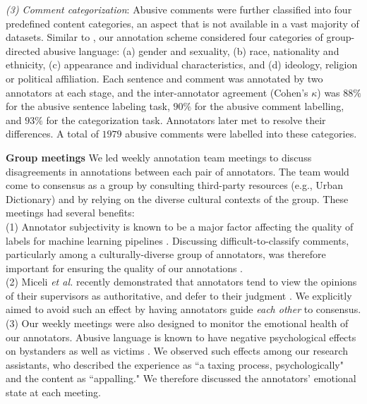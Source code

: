 \documentclass[letterpaper]{article} %
\begin{document}
 \textit{(3) Comment categorization}: Abusive comments were further classified into four predefined  content categories, an aspect that is not available in a vast majority of  datasets.  Similar to \cite{founta2018large}, our annotation scheme considered four categories of group-directed abusive language: (a) gender and sexuality, (b) race, nationality and ethnicity, (c) appearance and individual characteristics, and (d) ideology, religion or political affiliation.
 Each sentence and comment was annotated by two annotators at each stage, and the inter-annotator agreement (Cohen's $\kappa$) was $88\%$ for the abusive sentence labeling task, $90\%$ for the abusive comment labelling, and $93\%$ for the categorization task. Annotators later met to resolve their differences. A total of $1979$ abusive comments were labelled into these categories.


\noindent\textbf{Group meetings}
We led weekly annotation team meetings to discuss disagreements in annotations between each pair of annotators.
The team would come to consensus as a group by consulting third-party resources (e.g., Urban Dictionary) and by relying on the diverse cultural contexts of the group.
These meetings had several benefits: \\
(1) Annotator subjectivity is known to be a major factor affecting the quality of labels for machine learning pipelines \cite{hube2019understanding}.
Discussing difficult-to-classify comments, particularly among a culturally-diverse group of annotators, was therefore important for ensuring the quality of our annotations \cite{vidgen2019challenges}. \\
\noindent (2) Miceli \textit{et al.} recently demonstrated that annotators tend to view the opinions of their supervisors as authoritative, and defer to their judgment  \cite{miceli2020between}.
We explicitly aimed to avoid such an effect by having annotators guide \textit{each other} to consensus. \\
(3) Our weekly meetings were also designed to monitor the emotional health of our annotators.
Abusive language is known  to have negative psychological effects on bystanders as well as victims \cite{low2007experiences,ferguson2011know}.
We observed such effects among our research assistants, who described the experience as ``a taxing process, psychologically" and the content as ``appalling."
We therefore discussed the annotators' emotional state at each meeting.
\end{document}
